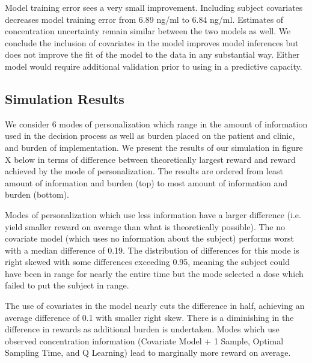 Model training error sees a very small improvement.  Including subject covariates decreases model training error from 6.89 ng/ml to 6.84 ng/ml. Estimates of concentration uncertainty remain similar between the two models as well.  We conclude the inclusion of covariates in the model improves model inferences but does not improve the fit of the model to the data in any substantial way.  Either model would require additional validation prior to using in a predictive capacity.

\subsection{Simulation Results}

We consider 6 modes of personalization which range in the amount of information used in the decision process as well as burden placed on the patient and clinic, and burden of implementation.  We present the results of our simulation in figure X below in terms of difference between theoretically largest reward and reward achieved by the mode of personalization.  The results are ordered from least amount of information and burden (top) to most amount of information and burden (bottom).

Modes of personalization which use less information have a larger difference (i.e. yield smaller reward on average than what is theoretically possible).  The no covariate model (which uses no information about the subject) performs worst with a median difference of 0.19.  The distribution of differences for this mode is right skewed with some differences exceeding 0.95, meaning the subject could have been in range for nearly the entire time but the mode selected a dose which failed to put the subject in range. 

The use of covariates in the model nearly cuts the difference in half, achieving an average difference of 0.1 with smaller right skew.  There is a diminishing in the difference in rewards as additional burden is undertaken. Modes which use observed concentration information (Covariate Model + 1 Sample, Optimal Sampling Time, and Q Learning) lead to marginally more reward on average.


